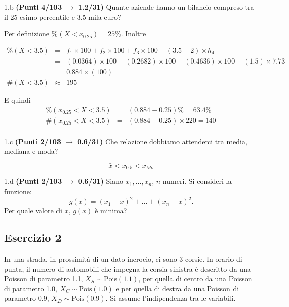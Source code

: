 \documentclass[
  11pt,
]{book}
\theoremstyle{mytheoremstyle}
\theoremstyle{mydefstyle}
\newenvironment{sol}
  {
  \begin{tcolorbox}[enhanced,breakable,arc=0.1mm,boxrule=1pt,colback=white,colframe=iblue,
  title=\bf \fontfamily{lmss}\selectfont \hspace{.5 cm} Soluzione,drop fuzzy shadow]

}{
\end{tcolorbox}
  }
\begin{document}
1.b \textbf{(Punti 4/103 \(\rightarrow\) 1.2/31)} Quante aziende hanno un bilancio compreso tra il 25-esimo
percentile e 3.5 mila euro?

\begin{sol}
Per definizione \(\%(X<x_{ 0.25 })= 25 \%\). Inoltre

\begin{eqnarray*}
   \%(X< 3.5 ) &=&  f_{ 1 }\times 100+f_{ 2 }\times 100+f_{ 3 }\times 100 +( 3.5 - 2 )\times h_{ 4 } \\
                &=&  ( 0.0364 )\times 100+( 0.2682 )\times 100+( 0.4636 )\times 100 +( 1.5 )\times  7.73  \\
                &=&  0.884 \times(100) \\
\#(X< 3.5 )    &\approx& 195 
\end{eqnarray*}

E quindi
\begin{eqnarray*}
   \%( x_{0.25} < X < 3.5 ) &=& ( 0.884 - 0.25 )\%= 63.4 \% \\
   \#( x_{0.25} < X < 3.5 ) &=& ( 0.884 - 0.25 )\times  220 = 140  \\
\end{eqnarray*}

\end{sol}

1.c \textbf{(Punti 2/103 \(\rightarrow\) 0.6/31)} Che relazione dobbiamo attenderci tra media, mediana e moda?

\begin{sol}
\[\bar x<x_{0.5}<x_{Mo}\]

\end{sol}

1.d \textbf{(Punti 2/103 \(\rightarrow\) 0.6/31)} Siano \(x_1,...,x_n\), \(n\) numeri. Si consideri la funzione:
\[g(x)=(x_1-x)^2+...+(x_n-x)^2.\]
Per quale valore di \(x\), \(g(x)\) è minima?

\subsection{Esercizio 2}\label{esercizio-2-17}

In una strada, in prossimità di un dato incrocio, ci sono 3 corsie.
In orario di punta, il numero di automobili che impegna la corsia sinistra è descritto
da una Poisson di parametro 1.1, \(X_S\sim\text{Pois}(1.1)\), per quella di centro da una Poisson di parametro 1.0, \(X_C\sim\text{Pois}(1.0)\) e per quella di destra da una Poisson di parametro 0.9, \(X_D\sim\text{Pois}(0.9)\). Si assume l'indipendenza tra le variabili.
\end{document}
